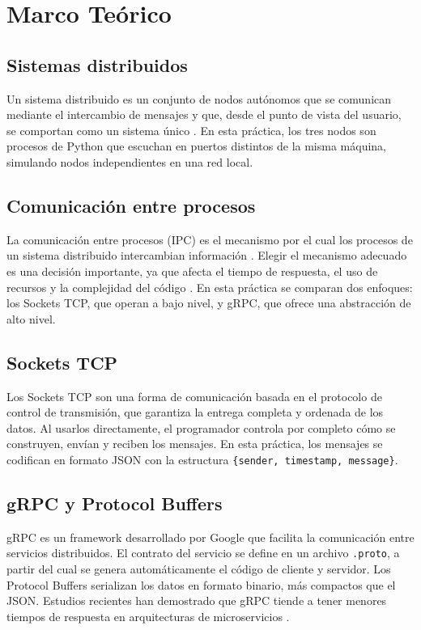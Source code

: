 \documentclass[12pt,a4paper]{article}
\begin{document}
\section{Marco Teórico}

\subsection{Sistemas distribuidos}

Un sistema distribuido es un conjunto de nodos autónomos que se comunican mediante el intercambio de mensajes y que, desde el punto de vista del usuario, se comportan como un sistema único \cite{vansteen2017}. En esta práctica, los tres nodos son procesos de Python que escuchan en puertos distintos de la misma máquina, simulando nodos independientes en una red local.

\subsection{Comunicación entre procesos}

La comunicación entre procesos (IPC) es el mecanismo por el cual los procesos de un sistema distribuido intercambian información \cite{fu2019}. Elegir el mecanismo adecuado es una decisión importante, ya que afecta el tiempo de respuesta, el uso de recursos y la complejidad del código \cite{chamas2017}. En esta práctica se comparan dos enfoques: los Sockets TCP, que operan a bajo nivel, y gRPC, que ofrece una abstracción de alto nivel.

\subsection{Sockets TCP}

Los Sockets TCP son una forma de comunicación basada en el protocolo de control de transmisión, que garantiza la entrega completa y ordenada de los datos. Al usarlos directamente, el programador controla por completo cómo se construyen, envían y reciben los mensajes. En esta práctica, los mensajes se codifican en formato JSON con la estructura \texttt{\{sender, timestamp, message\}}.

\subsection{gRPC y Protocol Buffers}

gRPC es un framework desarrollado por Google que facilita la comunicación entre servicios distribuidos. El contrato del servicio se define en un archivo \texttt{.proto}, a partir del cual se genera automáticamente el código de cliente y servidor. Los Protocol Buffers serializan los datos en formato binario, más compactos que el JSON. Estudios recientes han demostrado que gRPC tiende a tener menores tiempos de respuesta en arquitecturas de microservicios \cite{niswar2024}.
\end{document}
